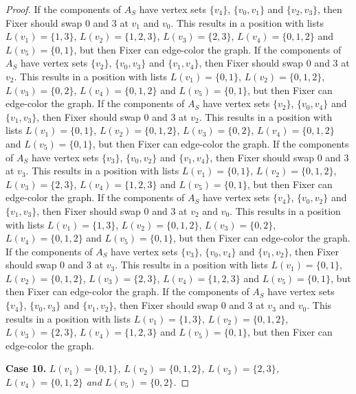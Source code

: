 \documentclass[12pt]{amsart}
\theoremstyle{plain}
\theoremstyle{definition}
\theoremstyle{remark}
\begin{document}
\begin{proof}
If the components of $A_S$ have vertex sets $\{v_4\}$, $\{v_0, v_1\}$ and $\{v_2, v_3\}$, then Fixer should swap 0 and 3 at $v_1$ and $v_0$. This results in a position with lists $L(v_1) = \{1, 3\}$, $L(v_2) = \{1, 2, 3\}$, $L(v_3) = \{2, 3\}$, $L(v_4) = \{0, 1, 2\}$ and $L(v_5) = \{0, 1\}$, but then Fixer can edge-color the graph.
If the components of $A_S$ have vertex sets $\{v_2\}$, $\{v_0, v_3\}$ and $\{v_1, v_4\}$, then Fixer should swap 0 and 3 at $v_2$. This results in a position with lists $L(v_1) = \{0, 1\}$, $L(v_2) = \{0, 1, 2\}$, $L(v_3) = \{0, 2\}$, $L(v_4) = \{0, 1, 2\}$ and $L(v_5) = \{0, 1\}$, but then Fixer can edge-color the graph.
If the components of $A_S$ have vertex sets $\{v_2\}$, $\{v_0, v_4\}$ and $\{v_1, v_3\}$, then Fixer should swap 0 and 3 at $v_2$. This results in a position with lists $L(v_1) = \{0, 1\}$, $L(v_2) = \{0, 1, 2\}$, $L(v_3) = \{0, 2\}$, $L(v_4) = \{0, 1, 2\}$ and $L(v_5) = \{0, 1\}$, but then Fixer can edge-color the graph.
If the components of $A_S$ have vertex sets $\{v_3\}$, $\{v_0, v_2\}$ and $\{v_1, v_4\}$, then Fixer should swap 0 and 3 at $v_3$. This results in a position with lists $L(v_1) = \{0, 1\}$, $L(v_2) = \{0, 1, 2\}$, $L(v_3) = \{2, 3\}$, $L(v_4) = \{1, 2, 3\}$ and $L(v_5) = \{0, 1\}$, but then Fixer can edge-color the graph.
If the components of $A_S$ have vertex sets $\{v_4\}$, $\{v_0, v_2\}$ and $\{v_1, v_3\}$, then Fixer should swap 0 and 3 at $v_2$ and $v_0$. This results in a position with lists $L(v_1) = \{1, 3\}$, $L(v_2) = \{0, 1, 2\}$, $L(v_3) = \{0, 2\}$, $L(v_4) = \{0, 1, 2\}$ and $L(v_5) = \{0, 1\}$, but then Fixer can edge-color the graph.
If the components of $A_S$ have vertex sets $\{v_3\}$, $\{v_0, v_4\}$ and $\{v_1, v_2\}$, then Fixer should swap 0 and 3 at $v_3$. This results in a position with lists $L(v_1) = \{0, 1\}$, $L(v_2) = \{0, 1, 2\}$, $L(v_3) = \{2, 3\}$, $L(v_4) = \{1, 2, 3\}$ and $L(v_5) = \{0, 1\}$, but then Fixer can edge-color the graph.
If the components of $A_S$ have vertex sets $\{v_4\}$, $\{v_0, v_3\}$ and $\{v_1, v_2\}$, then Fixer should swap 0 and 3 at $v_3$ and $v_0$. This results in a position with lists $L(v_1) = \{1, 3\}$, $L(v_2) = \{0, 1, 2\}$, $L(v_3) = \{2, 3\}$, $L(v_4) = \{1, 2, 3\}$ and $L(v_5) = \{0, 1\}$, but then Fixer can edge-color the graph.

\noindent\textbf{Case 10.  }\textit{$L(v_1) = \{0, 1\}$, $L(v_2) = \{0, 1, 2\}$, $L(v_3) = \{2, 3\}$, $L(v_4) = \{0, 1, 2\}$ and $L(v_5) = \{0, 2\}$.}


\end{proof}
\end{document}
